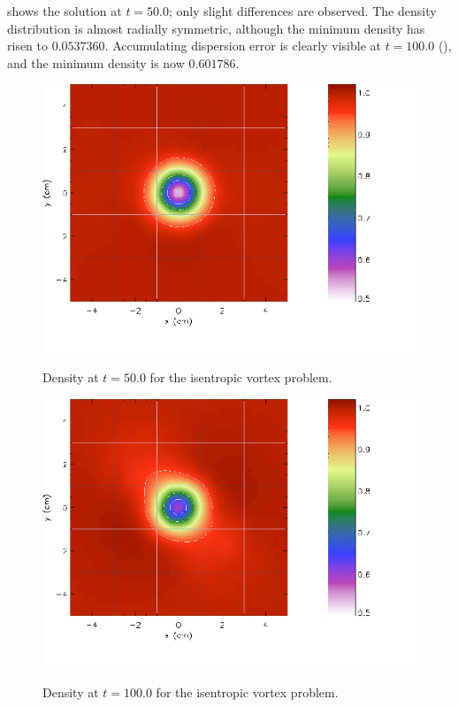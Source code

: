  shows the solution at $t=50.0$; only slight
differences are observed. The density distribution is almost
radially symmetric, although the minimum density has risen to
$0.0537360$. Accumulating dispersion error is clearly visible at
$t=100.0$ (), and the minimum density is now
$0.601786$.
\begin{figure}
\begin{center}
{\leavevmode\includegraphics[width=5in]{IsentropicVortex2}}
\end{center}
\caption{\label{Fig:iv2} Density at $t=50.0$ for the isentropic
vortex problem.}
\end{figure}

\begin{figure}
\begin{center}
{\leavevmode\includegraphics[width=5in]{IsentropicVortex3}}
\end{center}
\caption{\label{Fig:iv3} Density at $t=100.0$ for the isentropic
vortex problem.}
\end{figure}

